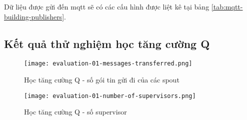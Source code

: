 Dữ liệu được gửi đến \gls{mqtt} sẽ có các cấu hình được liệt kê tại bảng \ref{tab:mqtt-building-publishers}.

\begin{table}[]
    \centering
    \caption{Dữ liệu gửi từ MQTT publisher}
    \label{tab:mqtt-building-publishers}
\end{table}

\subsection{Kết quả  thử nghiệm học tăng cường Q}

\begin{figure}[htbp]
    \centering
    \texttt{[image: evaluation-01-messages-transferred.png]}
    \caption{Học tăng cường Q - số gói tin gửi đi của các spout}
    \label{fig:evaluate-q-spout-messages-transferred}
\end{figure}

\begin{figure}[htbp]
    \centering
    \texttt{[image: evaluation-01-number-of-supervisors.png]}
    \caption{Học tăng cường Q - số supervisor}
    \label{fig:evaluate-q-supervisors}
\end{figure}

